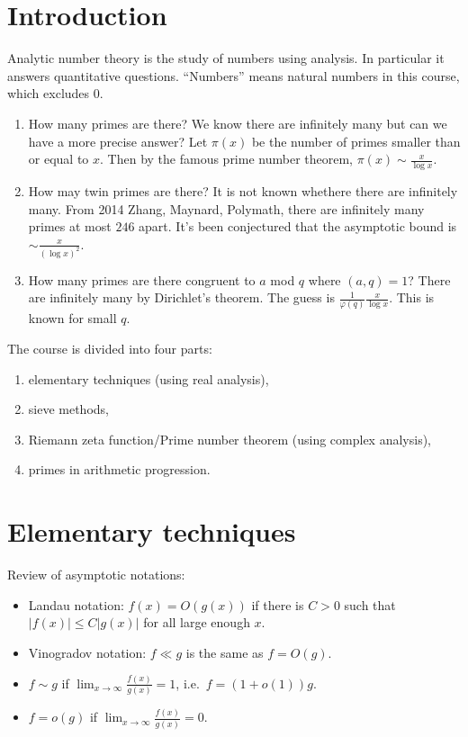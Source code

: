 \documentclass[a4paper]{article}
\begin{document}


\tableofcontents

\setcounter{section}{-1}

\section{Introduction}

Analytic number theory is the study of numbers using analysis. In particular it answers quantitative questions. ``Numbers'' means natural numbers in this course, which excludes \(0\).

\begin{eg}\leavevmode
  \begin{enumerate}
  \item How many primes are there? We know there are infinitely many but can we have a more precise answer? Let \(\pi(x)\) be the number of primes smaller than or equal to \(x\). Then by the famous prime number theorem, \(\pi(x) \sim \frac{x}{\log x}\).
  \item How may twin primes are there? It is not known whethere there are infinitely many. From 2014 Zhang, Maynard, Polymath, there are infinitely many primes at most \(246\) apart. It's been conjectured that the asymptotic bound is \(\sim \frac{x}{(\log x)^2}\).
  \item How many primes are there congruent to \(a\) mod \(q\) where \((a, q) = 1\)? There are infinitely many by Dirichlet's theorem. The guess is \(\frac{1}{\varphi(q)}\frac{x}{\log x}\). This is known for small \(q\).
  \end{enumerate}
\end{eg}

The course is divided into four parts:
\begin{enumerate}
\item elementary techniques (using real analysis),
\item sieve methods,
\item Riemann zeta function/Prime number theorem (using complex analysis),
\item primes in arithmetic progression. 
\end{enumerate}

\section{Elementary techniques}

Review of asymptotic notations:
\begin{itemize}
\item Landau notation: \(f(x) = O(g(x))\) if there is \(C > 0\) such that \(|f(x)| \leq C|g(x)|\) for all large enough \(x\).
\item Vinogradov notation: \(f \ll g\) is the same as \(f = O(g)\).
\item \(f \sim g\) if \(\lim_{x \to \infty} \frac{f(x)}{g(x)} = 1\), i.e.\ \(f = (1 + o(1)) g\).
\item \(f = o(g)\) if \(\lim_{x \to \infty} \frac{f(x)}{g(x)} = 0\).
\end{itemize}
\end{document}
